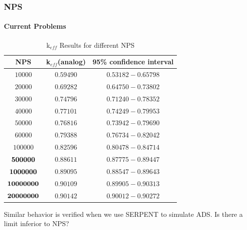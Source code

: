 \documentclass[svgnames,smaller,table]{beamer}
\begin{document}
\begin{frame}
  \frametitle{NPS}
  \framesubtitle{Current Problems}
  

\begin{table}[htb!]
\caption{k$_{eff}$ Results for different NPS}
\label{NPS}
\centering
\vspace{0.5cm}
\begin{tabular}{c|c|c}\hline
NPS & k$_{eff}$(analog) & 95\% confidence interval\\ \hline

$10000$ & $0.59490$ & $0.53182-0.65798$\\ \hline
$20000$ & $0.69282$ & $0.64750-0.73802$\\ \hline
$30000$ & $0.74796$ & $0.71240-0.78352$\\ \hline
$40000$ & $0.77101$ & $0.74249-0.79953$\\ \hline
$50000$ & $0.76816$ & $0.73942-0.79690$\\ \hline
$60000$ & $0.79388$ & $0.76734-0.82042$\\ \hline
$100000$ & $0.82596$ & $0.80478-0.84714$\\ \hline
${\bf 500000}$ & $0.88611$ & $0.87775-0.89447$\\ \hline
${\bf 1000000}$ & $0.89095$ & $0.88547-0.89643$\\ \hline
${\bf 10000000}$ & $0.90109$ & $0.89905-0.90313$\\ \hline
${\bf 20000000}$ & $0.90142$ & $0.90012-0.90272$\\ \hline
\end{tabular}
\end{table}

Similar behavior is verified when we use SERPENT to simulate ADS. Is there a limit inferior to NPS?
\end{frame}
\end{document}
